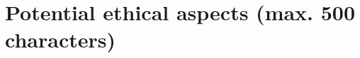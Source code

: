 \documentclass[a4paper,12pt]{article}
\begin{document}
\section{Potential ethical aspects (max. 500 characters)}

\end{document}
